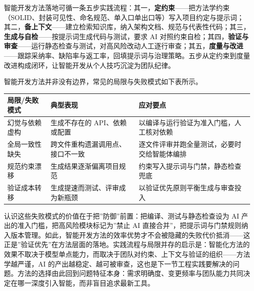 \documentclass[12pt,a4paper,twoside,openany]{ctexbook}
\numberwithin{figure}{chapter}
\numberwithin{table}{chapter}
\newcounter{none}
\begin{document}
智能开发方法落地可循一条五步实践流程：其一，\textbf{定约束}------把方法学约束（SOLID、封装可见性、命名规范、单入口单出口等）写入项目约定与提示词；其二，\textbf{备上下文}------建立检索知识库，纳入架构文档、规范与代表性代码；其三，\textbf{生成与自检}------按提示词生成代码与测试，要求
AI
对照约束自检；其四，\textbf{验证与审查}------运行静态检查与测试，对高风险改动人工逐行审查；其五，\textbf{度量与改进}------跟踪采纳率、缺陷率与返工率，回填提示词与治理策略。五步从定约束到度量改进构成闭环，让智能开发从个人技巧沉淀为团队纪律。

智能开发方法并非没有边界，常见的局限与失败模式如下表所示。

{\def\LTcaptype{none} %
\begin{longtable}[]{@{}
  >{\raggedright\arraybackslash}p{}
  >{\raggedright\arraybackslash}p{}
  >{\raggedright\arraybackslash}p{}@{}}
\toprule\noalign{}
\begin{minipage}[b]{\linewidth}\raggedright
局限/失败模式
\end{minipage} & \begin{minipage}[b]{\linewidth}\raggedright
典型表现
\end{minipage} & \begin{minipage}[b]{\linewidth}\raggedright
应对要点
\end{minipage} \\
\midrule\noalign{}
\endhead
\bottomrule\noalign{}
\endlastfoot
幻觉与依赖虚构 & 生成不存在的 API、依赖或配置 &
以编译与运行验证为准入门槛，人工核对依赖 \\
全局一致性缺失 & 跨文件重构遗漏调用点、接口不一致 &
逐文件评审并跑全量测试，必要时交给智能体编排 \\
规范约束漂移 & 生成结果逐渐偏离项目规范 &
约束写入提示词与门禁，静态检查兜底 \\
验证成本转移 & 生成提速而测试、评审成为新瓶颈 &
以验证优先原则平衡生成与审查投入 \\
\end{longtable}
}

认识这些失败模式的价值在于把''防御''前置：把编译、测试与静态检查设为 AI
产出的准入门槛，把高风险模块标记为''禁止 AI
直接合并''，把提示词与门禁规则纳入版本管理。如此，智能开发方法的效率优势才不会被隐藏的失败代价抵消------这正是''验证优先''在方法层面的落地。实践流程与局限并存的启示是：智能化方法的效果不取决于模型单点能力，而取决于团队对约束、上下文与验证的组织------方法学越严谨，AI
的产出越稳定、越可被审查，这也是下一节工程实践要解决的问题。方法的选择由此回到问题特征本身：需求明确度、变更频率与团队能力共同决定在哪一深度引入智能，而非盲目追求最新工具。
\end{document}
